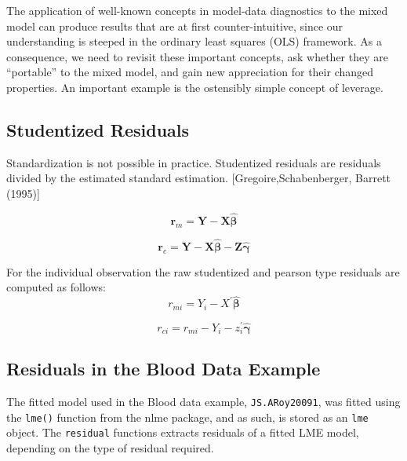 \documentclass[12pt, a4paper]{report}
\theoremstyle{plain}
\theoremstyle{definition}
\theoremstyle{remark}
\begin{document}
The application of well-known concepts in model-data diagnostics to the mixed model can produce results
		that are at first counter-intuitive, since our understanding is steeped in the ordinary least squares
		(OLS) framework. As a consequence, we need to revisit these important concepts, ask whether they
		are “portable” to the mixed model, and gain new appreciation for their changed properties. An important
		example is the ostensibly simple concept of leverage. 

	
	\subsection{Studentized Residuals}
	Standardization is not possible in practice. Studentized residuals are residuals divided by the estimated standard estimation.
	[Gregoire,Schabenberger, Barrett (1995)]
	
	\[\boldsymbol{r}_{m} = \boldsymbol{Y} -  \boldsymbol{X} \boldsymbol{\hat{\beta}} \]
	
	\[\boldsymbol{r}_{c} = \boldsymbol{Y} -  \boldsymbol{X} \boldsymbol{\hat{\beta}} -  \boldsymbol{Z} \boldsymbol{\hat{\gamma}}\]
	
	For the individual observation the raw studentized and pearson type residuals are computed as follows:
	\[r_{mi} =Y_{i} -X^{\prime} \boldsymbol{\hat{\beta}}\]
	
	\[r_{ci} = r_{mi} - Y_{i} - z_{i}^{\prime} \boldsymbol{\hat{\gamma}}\]
	
	
	\subsection{Residuals in the Blood Data Example}
	The fitted model used in the Blood data example, \texttt{JS.ARoy20091}, was fitted using the \texttt{lme()} function from the nlme package, and as such, is stored as an \texttt{lme} object. The \texttt{residual} functions extracts residuals of a fitted LME model, depending on the type of residual required.
	
\end{document}
